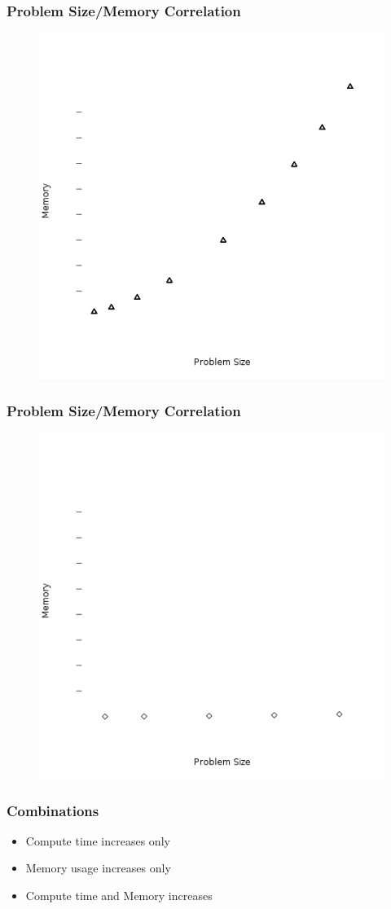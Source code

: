 \begin{frame}
		\frametitle{Problem Size/Memory Correlation}
			\begin{figure}
					\includegraphics[width=0.65\linewidth]{figures/memory/linpack}
			\end{figure}
\end{frame}

\begin{frame}
		\frametitle{Problem Size/Memory Correlation}
			\begin{figure}
			\includegraphics[width=0.65\linewidth]{figures/memory/laplace}
			\end{figure}
\end{frame}

\begin{frame}
		\frametitle{Combinations}
		\begin{itemize}
				\item Compute time increases only
				\item Memory usage increases only
				\item Compute time and Memory increases
		\end{itemize}
\end{frame}
